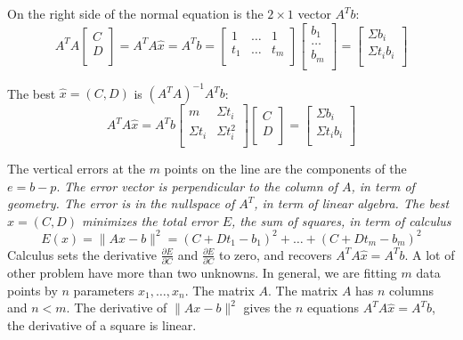 On the right side of the normal equation is the \(2 \times 1\) vector \(A^T b\):
\[
    A^T A 
    \begin{bmatrix}
         C \\
         D \\
    \end{bmatrix}
    = A^T A\hat{x} = A^T b = 
    \begin{bmatrix}
        1 & \ldots & 1  \\
        t_1 & \ldots & t_m  \\
    \end{bmatrix}
    \begin{bmatrix}
         b_1 \\
         \ldots \\
         b_m \\
    \end{bmatrix}
    = 
    \begin{bmatrix}
         \Sigma b_i \\
         \Sigma t_i b_i \\
    \end{bmatrix}
    \]  

The best  \(\hat{x} = (C, D)\) is \((A^T A)^{-1} A^T b \): 
\[
    A^T A\hat{x} = A^T b 
    \begin{bmatrix}
        m & \Sigma t_i  \\
        \Sigma t_i & \Sigma t^2_i  \\
    \end{bmatrix}
    \begin{bmatrix}
         C \\
         D \\
    \end{bmatrix}
    = 
    \begin{bmatrix}
         \Sigma b_i \\
         \Sigma t_i b_i \\
    \end{bmatrix}
\]  

The vertical errors at the \(m\) points on the line are the components of the \(e = b - p\). \emph{The error vector is perpendicular to the column of \(A\), in term of geometry. The error is in the nullspace of \(A^T\), in term of linear algebra. The best \(\hat{x} = (C, D)\) minimizes the total error \(E\), the sum of squares, in term of calculus    }
\[
    E(x) = \lVert Ax - b \rVert^2 = (C + Dt_1 - b_1)^2 + \ldots + (C + Dt_m - b_m)^2 
\]
Calculus sets the derivative \(\frac{\partial E}{\partial C}\) and \(\frac{\partial E}{\partial C}\) to zero, and recovers \(A^T A\hat{x} = A^T b\). A lot of other problem have more than two unknowns. In general, we are fitting \(m\) data points by \(n\) parameters \(x_1, \ldots, x_n\). The matrix \(A\). The matrix \(A\) has \(n\) columns and \(n < m\). The derivative of \(\lVert Ax - b \rVert^2 \) gives the \(n\) equations \(A^T A \hat{x} = A^T b\), the derivative of a square is linear. 

